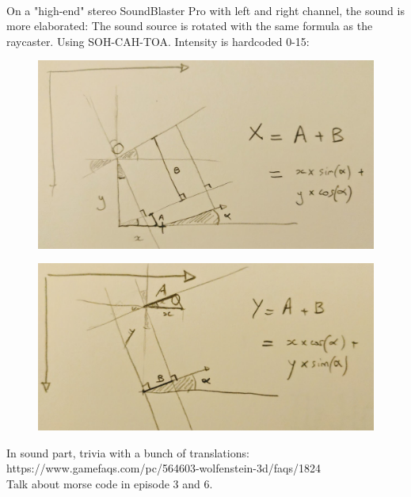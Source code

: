 \par
{}\\
\par

On a "high-end" stereo SoundBlaster Pro with left and right channel, the sound is more elaborated: The sound source is rotated with the same formula as the raycaster. Using SOH-CAH-TOA. Intensity is hardcoded 0-15:\\
\par
\begin{figure}[H]
\centering
 \includegraphics[width=\textwidth]{imgs/drawings/audio_y_rotate.png}
 \end{figure}
 \par
 \begin{figure}[H]
\centering
 \includegraphics[width=\textwidth]{imgs/drawings/audio_x_rotate.png}
 \end{figure}
\par
In sound part, trivia with a bunch of translations: https://www.gamefaqs.com/pc/564603-wolfenstein-3d/faqs/1824\\
Talk about morse code in episode 3 and 6.\\
\par
